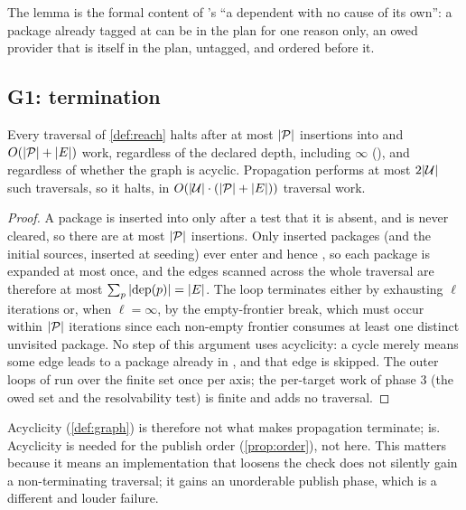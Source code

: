 The lemma is the formal content of 's ``a dependent with no cause
of its own'': a package already tagged at \Head{} can be in the plan for one
reason only, an owed provider that is itself in the plan, untagged, and
ordered before it.

\subsection{G1: termination}

\begin{theorem}[\G{1}, termination]
\label{thm:g1}
Every traversal of \cref{def:reach} halts after at most $|\mathcal{P}|$ insertions
into  and $O(|\mathcal{P}| + |E|)$ work, regardless of the declared
depth, including $\infty$ (\code{+*}), and regardless of whether the graph
is acyclic. Propagation performs at most $2|\mathcal{U}|$ such traversals, so it
halts, in $O(|\mathcal{U}|\cdot(|\mathcal{P}|+|E|))$ traversal work.
\end{theorem}

\begin{proof}
A package is inserted into  only after a test that it is absent, and
 is never cleared, so there are at most $|\mathcal{P}|$ insertions. Only
inserted packages (and the initial sources, inserted at seeding) ever enter
 and hence , so each package is expanded at most
once, and the edges scanned across the whole traversal are therefore at most
$\sum_{p}|\mathrm{dep}(p)| = |E|$. The loop terminates either by exhausting
$\ell$ iterations or, when $\ell = \infty$, by the empty-frontier break, which
must occur within $|\mathcal{P}|$ iterations since each non-empty frontier consumes
at least one distinct unvisited package. No step of this argument uses
acyclicity: a cycle merely means some edge leads to a package already in
, and that edge is skipped. The outer loops of  run over
the finite set \Units{} once per axis; the per-target work of phase 3 (the
owed set and the resolvability test) is finite and adds no traversal.
\end{proof}

\begin{remark}
Acyclicity (\cref{def:graph}) is therefore not what makes propagation
terminate;  is. Acyclicity is needed for the publish order
(\cref{prop:order}), not here. This matters because it means an implementation
that loosens the  check does not silently gain a non-terminating
traversal; it gains an unorderable publish phase, which is a different and
louder failure.
\end{remark}

